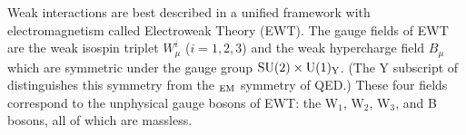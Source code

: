 




Weak interactions are best described in a unified framework with electromagnetism called Electroweak Theory (EWT). The gauge fields of EWT are the weak isospin triplet $W^i_{\mu}$ ($i = 1, 2, 3$) and the weak hypercharge field $B_{\mu}$ which are symmetric under the gauge group $\mathrm{SU(2)} \times \mathrm{U(1)_{Y}}$. (The Y subscript of \UoneY distinguishes this symmetry from the \Uone$_{\rm EM}$ symmetry of QED.) These four fields correspond to the unphysical gauge bosons of EWT: the W$_1$, W$_2$, W$_3$, and B bosons, all of which are massless. 

